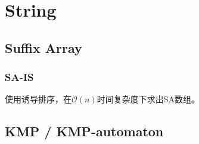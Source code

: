 \chapter{String}

\section{Suffix Array}
\subsection{SA-IS}
使用诱导排序，在$\mathcal{O}(n)$时间复杂度下求出SA数组。

\section{KMP / KMP-automaton}

